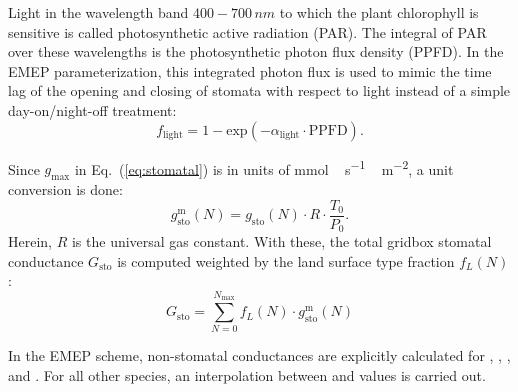 \documentclass[gmd, manuscript]{copernicus}
\begin{document}
Light in the wavelength band $400-700\,\unit{nm}$ to which the plant chlorophyll is sensitive is called photosynthetic active radiation (PAR). The integral of PAR over these wavelengths is the photosynthetic photon flux density (PPFD). In the EMEP parameterization, this integrated photon flux is used to mimic the time lag of the opening and closing of stomata with respect to light instead of a simple day-on/night-off treatment:
\begin{equation}
  f_\text{light} = 1-\text{exp}(-\alpha_\text{light}\cdot \text{PPFD}).
  \label{eq:flight}
\end{equation}

Since $g_\text{max}$ in Eq.~(\ref{eq:stomatal}) is in units of \unit{mmol\,s^{-1}\,m^{-2}}, a unit conversion is done:
\begin{equation}
  g^\text{m}_{\text{sto}}(N) = g_{\text{sto}}(N) \cdot R \cdot \frac{T_0}{P_0}.
\end{equation}
Herein, $R$ is the universal gas constant. With these, the total gridbox stomatal conductance $G_\text{sto}$ is computed weighted by the land surface type fraction $f_L(N)$:
\begin{equation}
  G_\text{sto} = \sum_{N=0}^{N_\text{max}} f_L(N)\cdot g^\text{m}_{\text{sto}}(N)
\end{equation}

In the EMEP scheme, non-stomatal conductances are explicitly calculated for , , , and . For all other species, an interpolation between  and  values is carried out.
\end{document}
